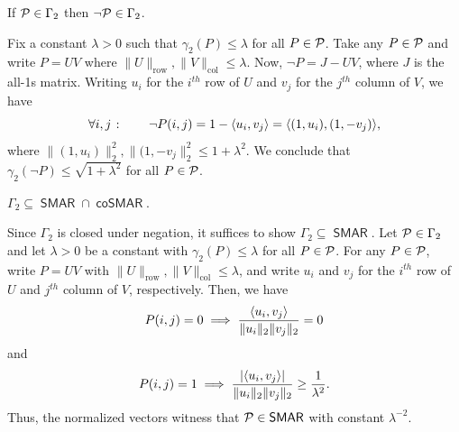 \documentclass[conference]{IEEEtran}
\newcommand{\cplxclass}[1]{\mathsf{#1}}
\DeclareMathOperator{\SMAR}{\cplxclass{SMAR}}
\DeclareMathOperator{\coSMAR}{\cplxclass{coSMAR}}
\begin{document}
\begin{fact}
    If $\mathcal{P} \in \Gamma_2$ then $\neg \mathcal{P} \in \Gamma_2$.
\end{fact}
\begin{IEEEproof}
    Fix a constant $\lambda > 0$ such that $\gamma_2(P) \leq \lambda$ for all $P
    \in \mathcal{P}$. Take any $P \in \mathcal{P}$ and write $P = UV$ where $\|U\|_\text{row},
    \|V\|_\text{col} \leq \lambda$. Now, $\neg P = J-UV$, where $J$ is the all-1s matrix.
    Writing $u_i$ for the $i^{th}$ row of $U$ and $v_j$ for the $j^{th}$ column of $V$, we have
    \[
        \forall i,j \;\colon\qquad \neg P(i,j) = 1 - \langle u_i, v_j \rangle
        = \langle (1, u_i), (1, - v_j) \rangle ,
    \]
    where $\|(1,u_i)\|_2^2, \|(1, -v_j\|_2^2 \leq 1 + \lambda^2$. We conclude that
    $\gamma_2(\neg P) \leq \sqrt{1+\lambda^2}$ for all $P \in \mathcal{P}$.
\end{IEEEproof}

\begin{proposition}\label{prop:gamma-in-smar}
    $\Gamma_2 \subseteq \SMAR \cap \coSMAR$.
\end{proposition}
\begin{IEEEproof}
Since $\Gamma_2$ is closed under negation, it suffices to show $\Gamma_2
\subseteq \SMAR$. Let $\mathcal{P} \in \Gamma_2$ and let $\lambda > 0$ be a constant
with $\gamma_2(P) \leq \lambda$ for all $P \in \mathcal{P}$. For any $P \in \mathcal{P}$,
write $P = UV$ with $\|U\|_\text{row}, \|V\|_\text{col} \leq \lambda$,
and write $u_i$ and $v_j$ for the $i^{th}$ row of $U$ and $j^{th}$ column of $V$,
respectively. Then, we have
\[
    P(i,j) = 0 \implies \frac{\langle u_i, v_j \rangle}{\|u_i\|_2 \|v_j\|_2 } = 0
\]
and
\[
    P(i,j) = 1 \implies \frac{ |\langle u_i, v_j \rangle| }{\|u_i\|_2 \|v_j\|_2 }
            \geq \frac{1}{\lambda^2}.
\]
Thus, the normalized vectors witness that $\cP \in \SMAR$ with constant $\lambda^{-2}$.
\end{IEEEproof}
\end{document}
